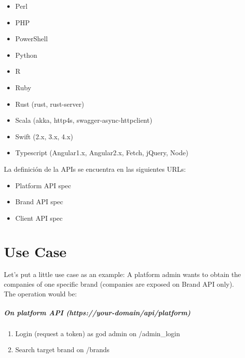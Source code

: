 \documentclass[letterpaper,10pt,spanish]{sphinxmanual}
\begin{document}
\begin{itemize}
\item {} 
Perl

\item {} 
PHP

\item {} 
PowerShell

\item {} 
Python

\item {} 
R

\item {} 
Ruby

\item {} 
Rust (rust, rust-server)

\item {} 
Scala (akka, http4s, swagger-async-httpclient)

\item {} 
Swift (2.x, 3.x, 4.x)

\item {} 
Typescript (Angular1.x, Angular2.x, Fetch, jQuery, Node)

\end{itemize}

La definición de la APIs se encuentra en las siguientes URLs:
\begin{itemize}
\item {} 
Platform API spec

\item {} 
Brand API spec

\item {} 
Client API spec

\end{itemize}


\chapter{Use Case}
\label{api_rest/use_case:use-case}\label{api_rest/use_case::doc}\label{api_rest/use_case:id1}
Let's put a little use case as an example: A platform admin wants to obtain the companies of one specific brand (companies are exposed on Brand API only). The operation would be:
\paragraph{On platform API (https://your-domain/api/platform)}
\begin{enumerate}
\item {} 
Login (request a token) as god admin on /admin\_login

\item {} 
Search target brand on /brands

\end{enumerate}
\end{document}
